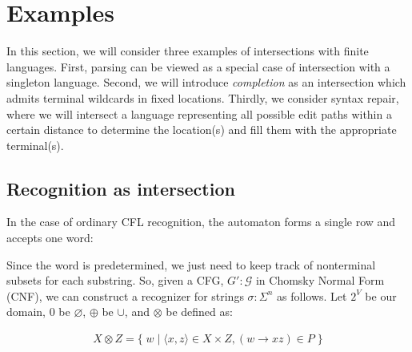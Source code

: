 \documentclass[sigplan,review,acmsmall,nonacm,screen,anonymous]{acmart}\settopmatter{printfolios=false,printccs=false,printacmref=false}
\begin{document}
\section{Examples}

In this section, we will consider three examples of intersections with finite languages. First, parsing can be viewed as a special case of intersection with a singleton language. Second, we will introduce \textit{completion} as an intersection which admits terminal wildcards in fixed locations. Thirdly, we consider syntax repair, where we will intersect a language representing all possible edit paths within a certain distance to determine the location(s) and fill them with the appropriate terminal(s).

\subsection{Recognition as intersection}

In the case of ordinary CFL recognition, the automaton forms a single row and accepts one word:

\begin{figure}[H]
\end{figure}

Since the word is predetermined, we just need to keep track of nonterminal subsets for each substring. So, given a CFG, $G' : \mathcal{G}$ in Chomsky Normal Form (CNF), we can construct a recognizer for strings $\sigma: \Sigma^n$ as follows. Let $2^V$ be our domain, $0$ be $\varnothing$, $\oplus$ be $\cup$, and $\otimes$ be defined as:\vspace{-10pt}

\begin{align}
  X \otimes Z = \big\{\;w \mid \langle x, z\rangle \in X \times Z, (w\rightarrow xz) \in P\;\big\}
\end{align}
\end{document}
